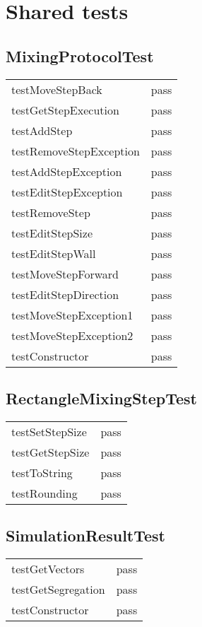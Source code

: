 \section{Shared tests}

\subsection*{MixingProtocolTest}
\begin{tabular}{l|l}
testMoveStepBack             & pass \\
testGetStepExecution        & pass \\
testAddStep                       & pass \\
testRemoveStepException & pass \\
testAddStepException        & pass \\
testEditStepException        & pass \\
testRemoveStep                 & pass \\
testEditStepSize                 & pass \\
testEditStepWall                 & pass \\
testMoveStepForward        & pass \\
testEditStepDirection          & pass \\
testMoveStepException1   & pass \\
testMoveStepException2   & pass \\
testConstructor                  & pass \\
\end{tabular}

\subsection*{RectangleMixingStepTest}
\begin{tabular}{l|l}
testSetStepSize  & pass \\
testGetStepSize  & pass \\
testToString        & pass \\
testRounding      & pass \\
\end{tabular}

\subsection*{SimulationResultTest}
\begin{tabular}{l|l}
testGetVectors         & pass \\
testGetSegregation & pass \\
testConstructor       & pass \\
\end{tabular}

